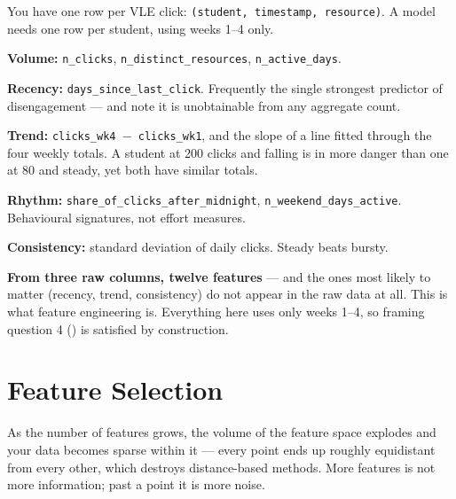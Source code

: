 \begin{worked}
You have one row per VLE click: \texttt{(student, timestamp, resource)}. A model
needs one row per student, using weeks 1--4 only.

\smallskip
\textbf{Volume:} \texttt{n\_clicks}, \texttt{n\_distinct\_resources},
\texttt{n\_active\_days}.

\textbf{Recency:} \texttt{days\_since\_last\_click}. Frequently the single
strongest predictor of disengagement --- and note it is unobtainable from any
aggregate count.

\textbf{Trend:} \texttt{clicks\_wk4 $-$ clicks\_wk1}, and the slope of a line
fitted through the four weekly totals. A student at 200 clicks and falling is in
more danger than one at 80 and steady, yet both have similar totals.

\textbf{Rhythm:} \texttt{share\_of\_clicks\_after\_midnight},
\texttt{n\_weekend\_days\_active}. Behavioural signatures, not effort measures.

\textbf{Consistency:} standard deviation of daily clicks. Steady beats bursty.

\smallskip
\textbf{From three raw columns, twelve features} --- and the ones most likely to
matter (recency, trend, consistency) do not appear in the raw data at all. This is
what feature engineering is. Everything here uses only weeks 1--4, so framing
question 4 () is satisfied by construction.
\end{worked}

\section{Feature Selection}

\begin{alertbox}
As the number of features grows, the volume of the feature space explodes and your
data becomes sparse within it --- every point ends up roughly equidistant from
every other, which destroys distance-based methods. More features is not more
information; past a point it is more noise.
\end{alertbox}

